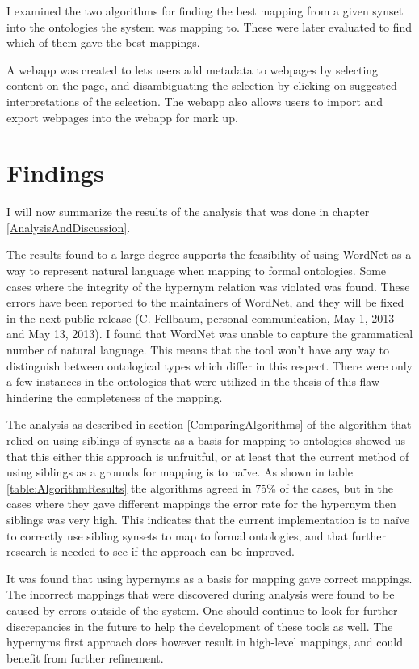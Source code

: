 I examined the two algorithms for finding the best mapping from a given synset into the ontologies the system was mapping to.
These were later evaluated to find which of them gave the best mappings.

A webapp was created to lets users add metadata to webpages by selecting content on the page,
and disambiguating the selection by clicking on suggested interpretations of the selection.
The webapp also allows users to import and export webpages into the webapp for mark up.

\section{Findings}
I will now summarize the results of the analysis that was done in chapter \ref{AnalysisAndDiscussion}.

The results found to a large degree supports the feasibility of using WordNet as a way to represent natural language
when mapping to formal ontologies.
Some cases where the integrity of the hypernym relation was violated was found.
These errors have been reported to the maintainers of WordNet, and they will be fixed in the next public  release (C. Fellbaum, personal communication, May 1, 2013 and May 13, 2013).
I found that WordNet was unable to capture the grammatical number of natural language.
This means that the tool won't have any way to distinguish between ontological types which differ in this respect.
There were only a few instances in the ontologies that were utilized in the thesis of this flaw hindering the completeness of the mapping.

The analysis as described in section \ref{ComparingAlgorithms} of the algorithm that relied on
using siblings of synsets as a basis for mapping to ontologies showed us that this either this approach is unfruitful,
or at least that the current method of using siblings as a grounds for mapping is to naïve.
As shown in table \ref{table:AlgorithmResults} the algorithms agreed in 75\% of the cases,
but in the cases where they gave different mappings the error rate for the hypernym then siblings was very high.
This indicates that the current implementation is to naïve to correctly use sibling synsets to map to formal ontologies,
and that further research is needed to see if the approach can be improved.

It was found that using hypernyms as a basis for mapping gave correct mappings.
The incorrect mappings that were discovered during analysis were found to be caused by errors outside of the system.
One should continue to look for further discrepancies in the future to help the development of these tools as well.
The hypernyms first approach does however result in high-level mappings, and could benefit from further refinement.

